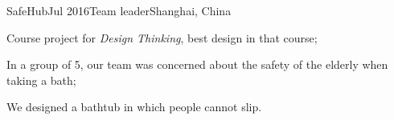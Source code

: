 \ifx\lang\eng
	\begin{rSubsection}{SafeHub}{Jul 2016}{Team leader}{Shanghai, China}
		\item Course project for \textit{Design Thinking}, best design in that course;
		\item In a group of 5, our team was concerned about the safety of the elderly when taking a bath;
		\item We designed a bathtub in which people cannot slip.
	\end{rSubsection}
\fi
